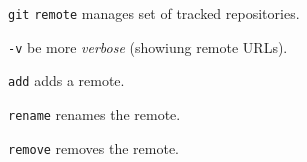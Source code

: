 %

\begin{compactenum}
\item [\texttt{git}] \texttt{remote} manages set of tracked repositories.
\item [\texttt{-v}] be more \emph{verbose} (showiung remote URLs).
\item [\scriptsize \texttt{add}] adds a remote.
\item [\scriptsize \texttt{rename}] renames the remote.
\item [\scriptsize \texttt{remove}] removes the remote.
\end{compactenum}

%